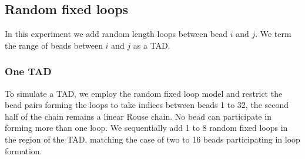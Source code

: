 \documentclass[12pt]{paper}
\begin{document}
\begin{figure}[H]
\label{encounterHistogram1To10InternalLoops}
\end{figure}


\subsection{Random fixed loops}\label{RandomFixedLoops}
In this experiment we add random length loops between bead $i$ and $j$. We term the range of beads between $i$ and $j$ as a TAD. 

\subsubsection{One TAD}
To simulate a TAD, we employ the random fixed loop model and restrict the bead pairs forming the loops to take indices between beads 1 to 32, the second half of the chain remains a linear Rouse chain. No bead can participate in forming more than one loop. 
We sequentially add 1 to 8 random fixed loops in the region of the TAD, matching the case of two to 16 beads participating in loop formation. 
\end{document}
